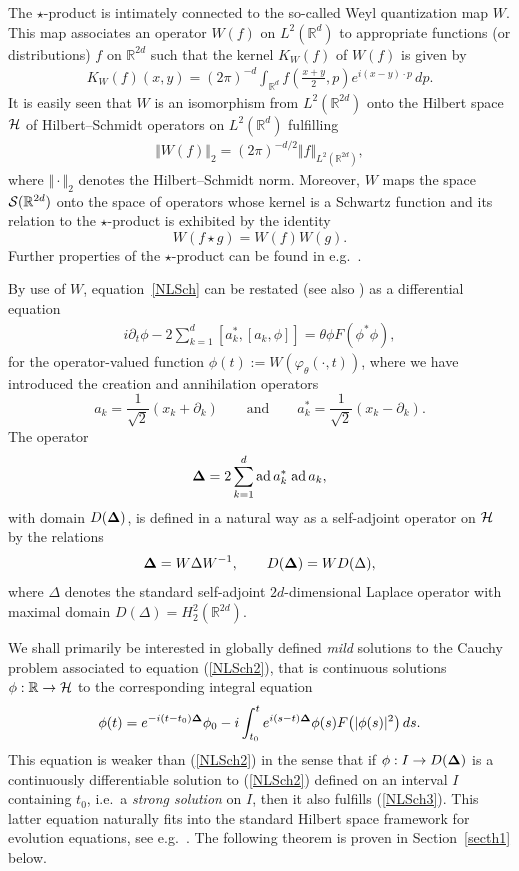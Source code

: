 \documentclass[11pt]{article}
\begin{document}
The $\star$-product is intimately connected to the so-called Weyl
quantization map $W$. This map associates an operator
$W(f)$ on $L^2(\mathbb R^d)$ to appropriate functions (or distributions) $f$ on $\mathbb R^{2d}$
such that the kernel $K_W(f)$ of $W(f)$ is given by
\begin{gather*}
K_W(f)(x,y)=(2\pi)^{-d}\int_{\mathbb
R^d}f\left(\frac{x+y}{2},p\right)e^{i(x-y)\cdot p}\,dp  .
\end{gather*}
 It is easily seen that $W$ is an
isomorphism from $L^2(\mathbb R^{2d})$ onto the Hilbert space $\cal H$ of
Hilbert--Schmidt operators on $L^2(\mathbb R^d)$ fulf\/illing
\begin{gather}
\label{Wunitary}
\Vert W(f)\Vert_2 = (2\pi)^{-d/2}\Vert f\Vert_{L^2(\mathbb R^{2d})} ,
\end{gather}
where $\Vert\cdot\Vert_2$ denotes the Hilbert--Schmidt norm. Moreover,
$W$ maps the space ${\cal S}(\mathbb R^{2d})$ onto the space of
operators whose kernel is a Schwartz function and its relation to the
$\star$-product is exhibited by the identity
\[
W(f\star g) = W(f)W(g) .
\]
Further properties of the $\star$-product can be found in
e.g.~\cite{GGBISV}.

By use of $W$, equation~\eqref{NLSch} can be restated (see also \cite{DJN})
as a dif\/ferential equation
\begin{gather}
\label{NLSch2}
i\partial_t\phi - 2 \sum_{k=1}^d[a_k^*,[a_k,\phi]] =\theta \phi F(\phi^*\phi) ,
\end{gather}
 for  the operator-valued function $\phi(t) := W(\varphi_\theta(\cdot,t))$,
where we have introduced the creation and annihilation operators
\[
a_k =\frac{1}{\sqrt 2}(x_k + \partial_k)\qquad\mbox{and}\qquad a_k^* =
\frac{1}{\sqrt 2}(x_k - \partial_k) .
\]
The operator
\[
{\bf \Delta} = 2 \sum_{k=1}^d \mbox{ad}\, a_k^*\;\mbox{ad}\, a_k,
\]
with domain $D({\bf\Delta})$,
is def\/ined in a natural way as a self-adjoint operator on $\cal H$ by the
relations
\begin{gather}
\label{tria}
{\bf \Delta} =  W\Delta W^{-1} ,\qquad D({\bf \Delta})=WD(\Delta) ,
\end{gather}
where $\Delta$ denotes the standard self-adjoint $2d$-dimensional Laplace
operator with maximal domain $D(\Delta)=H_2^2(\mathbb R^{2d})$.

We shall primarily be interested in globally def\/ined \emph{mild}
solutions to the Cauchy problem associated to
equation (\ref{NLSch2}), that is continuous solutions $\phi:\mathbb
R\to{\cal H}$ to the corresponding integral equation
\begin{gather}
\label{NLSch3}
\phi(t) = e^{-i(t-t_0){\bf \Delta}}\phi_0 - i\int_{t_0}^t e^{i(s-t){\bf \Delta}}
\phi(s) F\big(|\phi(s)|^2\big)\,ds .
\end{gather}
This equation is weaker than (\ref{NLSch2}) in the sense that if
$\phi: I\to D({\bf \Delta})$ is a continuously dif\/ferentiable solution to
(\ref{NLSch2}) def\/ined on an interval $I$ containing $t_0$, i.e.\ a
\emph{strong solution} on $I$, then it also fulf\/ills (\ref{NLSch3}).
This latter equation  naturally f\/its into
the standard Hilbert space framework for evolution equations, see
e.g.~\cite{RS,Reed}. The following theorem is proven in Section~\ref{secth1}
below.
\end{document}
